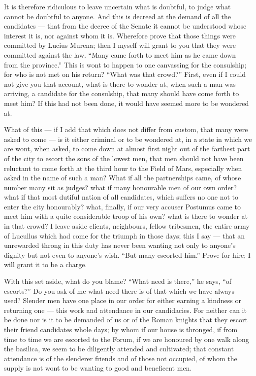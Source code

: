  It is therefore ridiculous to leave uncertain what is doubtful, to judge what cannot be doubtful to anyone. And this is decreed at the demand of all the candidates --- that from the decree of the Senate it cannot be understood whose interest it is, nor against whom it is. Wherefore prove that those things were committed by Lucius Murena; then I myself will grant to you that they were committed against the law. ``Many came forth to meet him as he came down from the province.'' This is wont to happen to one canvassing for the consulship; for who is not met on his return? ``What was that crowd?'' First, even if I could not give you that account, what is there to wonder at, when such a man was arriving, a candidate for the consulship, that many should have come forth to meet him? If this had not been done, it would have seemed more to be wondered at.

 What of this --- if I add that which does not differ from custom, that many were asked to come --- is it either criminal or to be wondered at, in a state in which we are wont, when asked, to come down at almost first night out of the farthest part of the city to escort the sons of the lowest men, that men should not have been reluctant to come forth at the third hour to the Field of Mars, especially when asked in the name of such a man? What if all the partnerships came, of whose number many sit as judges? what if many honourable men of our own order? what if that most dutiful nation of all candidates, which suffers no one not to enter the city honourably? what, finally, if our very accuser Postumus came to meet him with a quite considerable troop of his own? what is there to wonder at in that crowd? I leave aside clients, neighbours, fellow tribesmen, the entire army of Lucullus which had come for the triumph in those days; this I say --- that an unrewarded throng in this duty has never been wanting not only to anyone's dignity but not even to anyone's wish. ``But many escorted him.'' Prove for hire; I will grant it to be a charge.

 With this set aside, what do you blame? ``What need is there,'' he says, ``of escorts?'' Do you ask of me what need there is of that which we have always used? Slender men have one place in our order for either earning a kindness or returning one --- this work and attendance in our candidacies. For neither can it be done nor is it to be demanded of us or of the Roman knights that they escort their friend candidates whole days; by whom if our house is thronged, if from time to time we are escorted to the Forum, if we are honoured by one walk along the basilica, we seem to be diligently attended and cultivated; that constant attendance is of the slenderer friends and of those not occupied, of whom the supply is not wont to be wanting to good and beneficent men.

